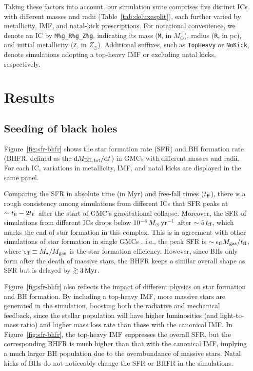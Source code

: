 \documentclass[twocolumn]{aastex631}
\begin{document}
Taking these factors into account, our simulation suite comprises five distinct ICs with different masses and radii (Table~\ref{tab:deluxesplit}), each further varied by metallicity, IMF, and natal-kick prescriptions. For notational convenience, we denote an IC by \texttt{M\%g\_R\%g\_Z\%g}, indicating its mass (\texttt{M}, in $M_\odot$), radius (\texttt{R}, in pc), and initial metallicity (\texttt{Z}, in $Z_\odot$). Additional suffixes, such as \texttt{TopHeavy} or \texttt{NoKick}, denote simulations adopting a top-heavy IMF or excluding natal kicks, respectively.


\section{Results}
\label{sec:results}

\subsection{Seeding of black holes}

Figure~\ref{fig:sfr-bhfr} shows the star formation rate (SFR) and BH formation rate (BHFR, defined as the $\dd M_{\rm BH,tot}/\dd t$) in GMCs with different masses and radii. For each IC, variations in metallicity, IMF, and natal kicks are displayed in the same panel. 

Comparing the SFR in absolute time (in Myr) and free-fall times ($t_{\rm ff}$), there is a rough consistency among simulations from different ICs that SFR peaks at $\sim t_{\rm ff} - 2 t_{\rm ff}$ after the start of GMC's gravitational collapse. Moreover, the SFR of simulations from different ICs drops below $10^{-4}\,M_\odot\,{\rm yr}^{-1}$ after $\sim 5\,t_{\rm ff}$, which marks the end of star formation in this complex. This is in agreement with other simulations of star formation in single GMCs \citep{GrudicHopkinsFaucher-Giguere_2018MNRAS.475.3511G}, i.e., the peak SFR is $\sim \epsilon_{\rm ff} M_{\rm gas}/t_{\rm ff}$, where $\epsilon_{\rm ff} \equiv M_{\star}/M_{\rm gas}$ is the star formation efficiency. However, since BHs only form after the death of massive stars, the BHFR keeps a similar overall shape as SFR but is delayed by $\gtrsim 3\,\rm Myr$. 

Figure~\ref{fig:sfr-bhfr} also reflects the impact of different physics on star formation and BH formation. By including a top-heavy IMF, more massive stars are generated in the simulation, boosting both the radiative and mechanical feedback, since the stellar population will have higher luminosities (and light-to-mass ratio) and higher mass loss rate \citep{Vink_2023A&A...679L...9V} than those with the canonical IMF. In Figure~\ref{fig:sfr-bhfr}, the top-heavy IMF suppresses the overall SFR, but the corresponding BHFR is much higher than that with the canonical IMF, implying a much larger BH population due to the overabundance of massive stars. Natal kicks of BHs do not noticeably change the SFR or BHFR in the simulations.
\end{document}
